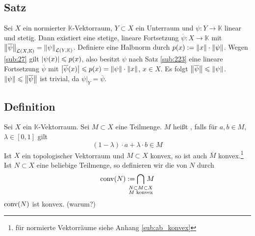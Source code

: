 \subsection[Satz (Hahn-Banach): Existenz einer stetigen linearen Fortsetzung]{Satz} %
\label{sub:224}
Sei $X$ ein normierter $\mathds{K}$-Vektorraum, $Y \subset X$ ein Unterraum und $\psi \colon Y \to \mathds{K}$ linear und stetig. Dann existiert eine stetige, lineare 
Fortsetzung $\overline{\psi} \colon X \to \mathds{K}$ mit $\norm[\mathcal{L}(X,\mathds{K})]{\overline{\psi}} = \norm[\mathcal{L}(Y,\mathds{K})]{\psi}$.
Definiere eine Halbnorm durch $p(x) := \norm{x} \cdot \norm{\psi}$. Wegen \ref{sub:27} gilt $\abs*{\psi(x)} \le p(x)$, also
besitzt $\psi$ nach Satz \ref{sub:223} eine lineare Fortsetzung $\overline{\psi}$ mit $\abs[\big]{\overline{\psi}(x)} \le p(x)= \norm{\psi} \cdot \norm{x}$, $x \in X$. 
Es folgt $\norm{\overline{\psi}} \le \norm{\psi}$. $\norm{\psi} \le \norm{\overline{\psi}}$ ist trivial, da $\psi|_{Y} = \overline{\psi}$. \bewende

\subsection[Definition: Konvexe Teilmenge eines $\mathds{K}$-Vektorraums, konvexe Hülle]{Definition} %
\label{sub:225}
Sei $X$ ein $\mathds{K}$-Vektorraum. Sei $M \subset X$ eine Teilmenge. $M$ heißt , falls für $a,b \in M$, $\lambda \in [0,1]$ gilt
\[
	(1-\lambda ) \cdot a + \lambda \cdot b \in M
\]
Ist $X$ ein topologischer Vektorraum und $M \subset X$ konvex, so ist auch $\overline{M}$ konvex.\footnote{für normierte Vektorräume siehe Anhang \ref{sub:ab_konvex}}
Ist $N \subset X$ eine beliebige Teilmenge, so definieren wir die  von $N$ durch  
\[
	\conv(N) := \smashoperator{\bigcap_{\substack{N \subset M \subset X \\ M \text{ konvex} }}} \, M
\]
$\conv(N)$ ist konvex. (warum?)

